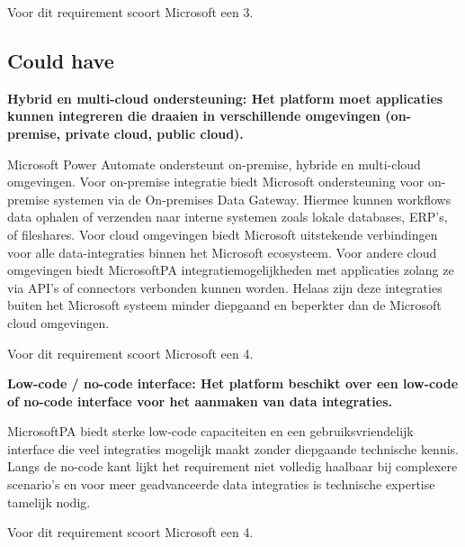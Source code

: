 Voor dit requirement scoort Microsoft een 3.

\vspace{\baselineskip}

\subsection{Could have}%
\label{CouldHaveMicrosoft}

\textbf{Hybrid en multi-cloud ondersteuning: Het platform moet applicaties kunnen integreren die draaien in verschillende omgevingen (on-premise, private cloud, public cloud).}

\vspace{\baselineskip}

Microsoft Power Automate ondersteunt on-premise, hybride en multi-cloud omgevingen. Voor on-premise integratie biedt Microsoft ondersteuning voor on-premise systemen via de On-premises Data Gateway. Hiermee kunnen workflows data ophalen of verzenden naar interne systemen zoals lokale databases, ERP’s, of fileshares. Voor cloud omgevingen biedt Microsoft uitstekende verbindingen voor alle data-integraties binnen het Microsoft ecosysteem. Voor andere cloud omgevingen biedt MicrosoftPA integratiemogelijkheden met applicaties zolang ze via API’s of connectors verbonden kunnen worden. Helaas zijn deze integraties buiten het Microsoft systeem minder diepgaand en beperkter dan de Microsoft cloud omgevingen. 


Voor dit requirement scoort Microsoft een 4.

\vspace{\baselineskip}

\textbf{Low-code / no-code interface: Het platform beschikt over een low-code of no-code interface voor het aanmaken van data integraties.}

\vspace{\baselineskip}

MicrosoftPA biedt sterke low-code capaciteiten en een gebruiksvriendelijk interface die veel integraties mogelijk maakt zonder diepgaande technische kennis. Langs de no-code kant lijkt het requirement niet volledig haalbaar bij complexere scenario's en voor meer geadvanceerde data integraties is technische expertise tamelijk nodig.

Voor dit requirement scoort Microsoft een 4.

\newpage

